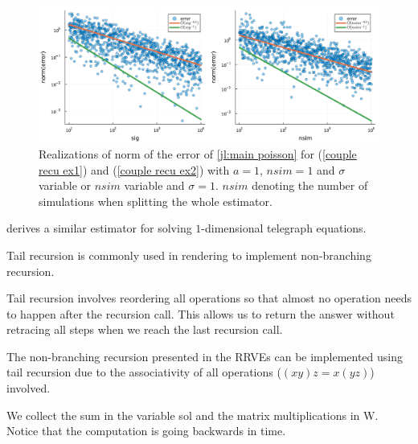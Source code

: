 \documentclass[a4paper,12pt]{article}
\begin{document}
\begin{figure}[h!]
  \centering
  \includegraphics[width=\textwidth]{julia_plots/main_poisson_convergence.pdf}
  \caption{Realizations of norm of the error of \ref{jl:main poisson} for (\ref{couple recu ex1}) and (\ref{couple recu ex2}) with $a=1$,
    $nsim =1$ and $\sigma$ variable or $nsim$ variable and $\sigma = 1$. $nsim$ denoting the number of simulations
    when splitting the whole estimator.}
  \label{fig:main poisson convergence}
\end{figure}

\begin{related}
  \cite{acebron_monte_2016} derives a similar estimator for solving
  $1$-dimensional telegraph equations.
\end{related}

Tail recursion is commonly used in rendering to implement non-branching recursion.

\begin{technique}
  Tail recursion involves reordering all operations
  so that almost no operation needs to happen after
  the recursion call. This allows us to return the
  answer without retracing all steps when we reach
  the last recursion call.
\end{technique}

The non-branching recursion presented in the RRVEs can
be implemented using tail recursion due to the associativity
of all operations ($(xy)z = x(yz)$) involved.

\begin{julia}
  We collect the sum in the variable sol and the matrix multiplications in W.
  Notice that the computation is going backwards in time.

\end{julia}
\end{document}
